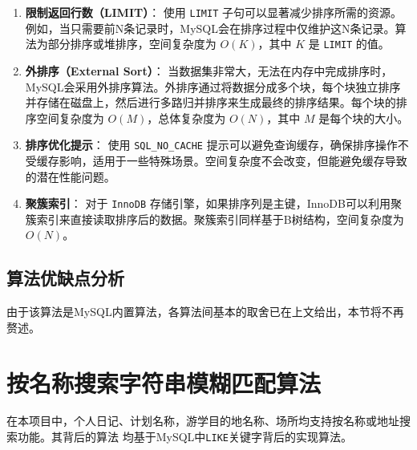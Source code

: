 \documentclass{report}
\begin{document}
\begin{enumerate}
    \item \textbf{限制返回行数（LIMIT）}：
    使用 \verb|LIMIT| 子句可以显著减少排序所需的资源。例如，当只需要前N条记录时，MySQL会在排序过程中仅维护这N条记录。算法为部分排序或堆排序，空间复杂度为 $O(K)$，其中 $K$ 是 \verb|LIMIT| 的值。
    
    \item \textbf{外排序（External Sort）}：
    当数据集非常大，无法在内存中完成排序时，MySQL会采用外排序算法。外排序通过将数据分成多个块，每个块独立排序并存储在磁盘上，然后进行多路归并排序来生成最终的排序结果。每个块的排序空间复杂度为 $O(M)$，总体复杂度为 $O(N)$，其中 $M$ 是每个块的大小。
    
    \item \textbf{排序优化提示}：
    使用 \verb|SQL_NO_CACHE| 提示可以避免查询缓存，确保排序操作不受缓存影响，适用于一些特殊场景。空间复杂度不会改变，但能避免缓存导致的潜在性能问题。
    
    \item \textbf{聚簇索引}：
    对于 \verb|InnoDB| 存储引擎，如果排序列是主键，InnoDB可以利用聚簇索引来直接读取排序后的数据。聚簇索引同样基于B树结构，空间复杂度为 $O(N)$。
\end{enumerate}
\subsection{算法优缺点分析}
由于该算法是MySQL内置算法，各算法间基本的取舍已在上文给出，本节将不再赘述。

\section{按名称搜索字符串模糊匹配算法}
在本项目中，个人日记、计划名称，游学目的地名称、场所均支持按名称或地址搜索功能。其背后的算法
均基于MySQL中\verb|LIKE|关键字背后的实现算法。
\end{document}
